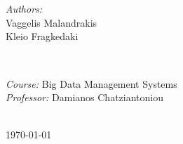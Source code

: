 \documentclass[
11pt, %
english,
singlespacing, %
headsepline, %
]{HadoopAssignment} %
\author{Klio \textsc{Fragkedaki}} %
\begin{document}
\frontmatter %

\pagestyle{plain} %


\begin{titlepage}
\begin{center}

\vspace*{.06\textheight}
{\scshape\LARGE \univname\par}\vspace{1.5cm} %

\HRule \\[0.4cm] %
{\LARGE \bfseries \ttitle\par}\vspace{0.4cm} %
\HRule \\[1.5cm] %
 
\begin{minipage}[t]{0.4\textwidth}
\begin{center} \large
\emph{Authors:}\\
Vaggelis Malandrakis\\[0.2cm]
Kleio Fragkedaki 
\end{center}
\end{minipage}
\begin{minipage}[t]{0.4\textwidth}

\end{minipage}\\[3cm]
 
\vfill

\large \textit{Course:} Big Data Management Systems\\[0.3cm]
\textit{Professor:} Damianos Chatziantoniou\\[0.4cm]
\deptname\\[2cm] %
 
\vfill
\vspace{5cm}

{\large \today}\\[4cm] %
 
\end{center}
\end{titlepage}
\end{document}
